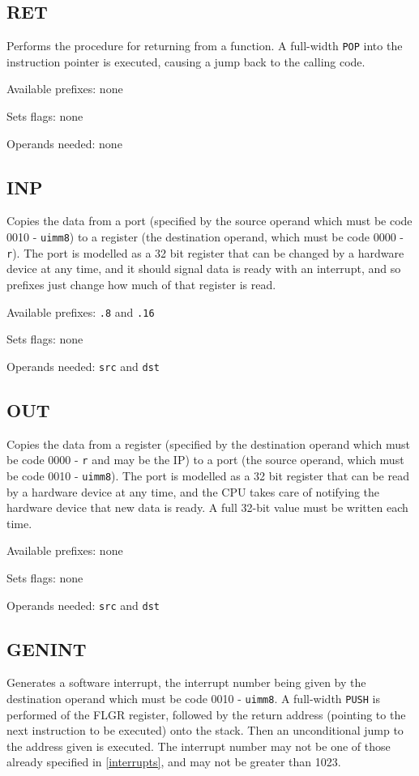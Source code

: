 \documentclass[12pt,a4paper]{report}
\begin{document}
\subsection*{RET}
Performs the procedure for returning from a function. A full-width \texttt{POP} into the instruction pointer is executed, causing a jump back to the calling code.

Available prefixes: none

Sets flags: none

Operands needed: none

\subsection*{INP}
Copies the data from a port (specified by the source operand which must be code 0010 - \texttt{uimm8}) to a register (the destination operand, which must be code 0000 - \texttt{r}). The port is modelled as a 32 bit register that can be changed by a hardware device at any time, and it should signal data is ready with an interrupt, and so prefixes just change how much of that register is read.

Available prefixes: \texttt{.8} and \texttt{.16}

Sets flags: none

Operands needed: \texttt{src} and \texttt{dst}

\subsection*{OUT}
Copies the data from a register (specified by the destination operand which must be code 0000 - \texttt{r} and may be the IP) to a port (the source operand, which must be code 0010 - \texttt{uimm8}). The port is modelled as a 32 bit register that can be read by a hardware device at any time, and the CPU takes care of notifying the hardware device that new data is ready. A full 32-bit value must be written each time.

Available prefixes: none

Sets flags: none

Operands needed: \texttt{src} and \texttt{dst}

\subsection*{GENINT}
Generates a software interrupt, the interrupt number being given by the destination operand which must be code 0010 - \texttt{uimm8}. A full-width \texttt{PUSH} is performed of the FLGR register, followed by the return address (pointing to the next instruction to be executed) onto the stack. Then an unconditional jump to the address given is executed. The interrupt number may not be one of those already specified in \autoref{interrupts}, and may not be greater than 1023.
\end{document}
